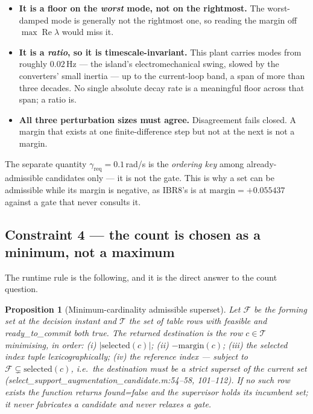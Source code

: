\documentclass[12pt,a4paper]{article}
\newtheorem{proposition}{Proposition}
\theoremstyle{remark}
\newcommand{\greq}{\gamma_{\mathrm{req}}}
\newcommand{\code}[1]{{\ttfamily\small\hyphenchar\font=-1 #1}}
\begin{document}
\begin{itemize}[leftmargin=1.5em,itemsep=2pt]
\item \textbf{It is a floor on the \emph{worst} mode, not on the rightmost.}
      The worst-damped mode is generally not the rightmost one, so reading the
      margin off $\max\operatorname{Re}\lambda$ would miss it.
\item \textbf{It is a \emph{ratio}, so it is timescale-invariant.} This plant
      carries modes from roughly $0.02$\,Hz --- the island's electromechanical
      swing, slowed by the converters' small inertia --- up to the current-loop
      band, a span of more than three decades. No single absolute decay rate is
      a meaningful floor across that span; a ratio is.
\item \textbf{All three perturbation sizes must agree.} Disagreement fails
      closed. A margin that exists at one finite-difference step but not at the
      next is not a margin.
\end{itemize}

The separate quantity $\greq = 0.1$\,rad/s is the \emph{ordering key} among
already-admissible candidates only --- it is not the gate. This is why a set can
be admissible while its \code{margin} is negative, as IBR8's is at
$\mathrm{margin} = +0.055437$ against a gate that never consults it.

\subsection{Constraint 4 --- the count is chosen as a minimum, not a maximum}

The runtime rule is the following, and it is the direct answer to the count
question.

\begin{proposition}[Minimum-cardinality admissible superset]
\label{prop:superset}
Let $\mathcal{F}$ be the forming set at the decision instant and $\mathcal{T}$
the set of table rows with \code{feasible} and \code{ready\_to\_commit} both
true. The returned destination is the row $c \in \mathcal{T}$ minimising, in
order: (i) $|\mathrm{selected}(c)|$; (ii) $-\mathrm{margin}(c)$; (iii) the
selected index tuple lexicographically; (iv) the reference index --- subject to
$\mathcal{F} \subsetneq \mathrm{selected}(c)$, i.e.\ the destination must be a
\emph{strict} superset of the current set
\code{(select\_support\_augmentation\_candidate.m:54--58, 101--112)}. If no such
row exists the function returns \code{found=false} and the supervisor holds its
incumbent set; it never fabricates a candidate and never relaxes a gate.
\end{proposition}
\end{document}
